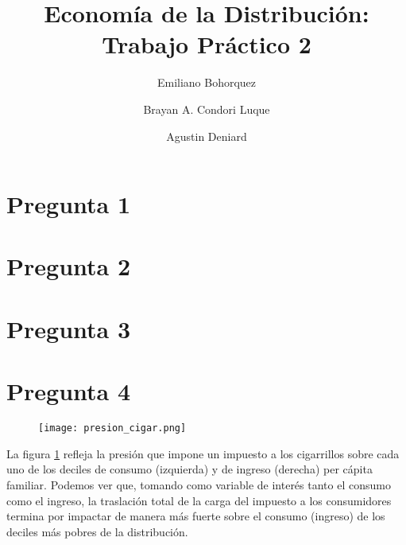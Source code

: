 \documentclass[11pt,oneside]{article}
\begin{document}
	
	
	\title{Economía de la Distribución: Trabajo Práctico 2}
	\author{
		Emiliano Bohorquez \and 
		Brayan A. Condori Luque \and 
		Agustin Deniard}
	
	\maketitle
	
	\section*{Pregunta 1}
	
	
	\section*{Pregunta 2}
	
	
	\section*{Pregunta 3}
	
	
 	\section*{Pregunta 4}

	\begin{figure}
    		\centering
    		\texttt{[image: presion\_cigar.png]}
    		\label{fig:4A}
	\end{figure}

	La figura \ref{fig:4A} refleja la presión que impone un impuesto a los cigarrillos sobre cada uno de los deciles de consumo (izquierda) y de ingreso (derecha) per cápita familiar. Podemos ver que, tomando como variable de interés tanto el consumo como el ingreso, la traslación total de la carga del impuesto a los consumidores termina por impactar de manera más fuerte sobre el consumo (ingreso) de los deciles más pobres de la distribución. 
\end{document}
